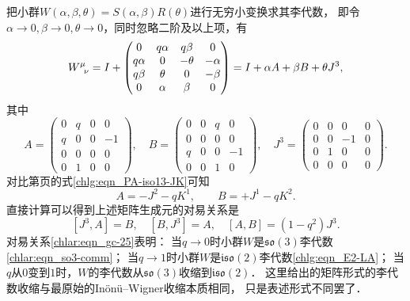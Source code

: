 把小群$W(\alpha,\beta,\theta) = S(\alpha,\beta)R(\theta)$进行无穷小变换求其李代数，
即令$\alpha  \to 0,\beta  \to 0,\theta  \to 0$，同时忽略二阶及以上项，有
\begin{equation}\label{chlar:eqn_gc-20}
	W^{\mu}_{\hphantom{\mu}\nu}= I + \begin{pmatrix}
		0&{q\alpha }&{q\beta }&0 \\
		{q\alpha }& 0&-\theta &{ - \alpha } \\
		{q\beta }&  {  \theta }&0&{ - \beta } \\
		0&  \alpha &\beta &0
	\end{pmatrix}
	= I + \alpha A + \beta B + \theta {J^3},
\end{equation}
其中
\begin{equation*} %
	A = \begin{pmatrix}
		0&q&0&0\\
		q&0&0&{ - 1} \\
		0&0&0&0 \\
		0&1&0&0
	\end{pmatrix},\quad B = \begin{pmatrix}
		0&0&q&0 \\
		0&0&0&0 \\
		q&0&0&{ - 1} \\
		0&0&1&0
	\end{pmatrix},\quad {J^3} = \begin{pmatrix}
		0&0&0&0 \\
		0&0&-1&0 \\
		0&{1}&0&0 \\
		0&0&0&0
	\end{pmatrix}.
\end{equation*}
对比第\pageref{chlg:eqn_PA-iso13-JK}页的式\eqref{chlg:eqn_PA-iso13-JK}可知
\begin{equation}
	A= -J^2-q K^1 ,\qquad B = +J^1-q K^2 .
\end{equation}
直接计算可以得到上述矩阵生成元的对易关系是
\begin{equation}\label{chlar:eqn_gc-25}
	\left[ {{J^3},A} \right] =   B,\quad
	\left[ {B,{J^3}} \right] =   A,\quad
	\left[ {A,B} \right] =   \left( {1 - {q^2}} \right){J^3}.
\end{equation}
对易关系\eqref{chlar:eqn_gc-25}表明：
当$q\to 0$时小群$W$是$\mathfrak{so}(3)$李代数\eqref{chlar:eqn_so3-comm}；
当$q\to 1$时小群$W$是$\mathfrak{iso}(2)$李代数\eqref{chlg:eqn_E2-LA}；
当$q$从$0$变到$1$时，$W$的李代数从$\mathfrak{so}(3)$收缩到$\mathfrak{iso}(2)$．
这里给出的矩阵形式的李代数收缩与最原始的In\"on\"u--Wigner收缩本质相同，
只是表述形式不同罢了．

